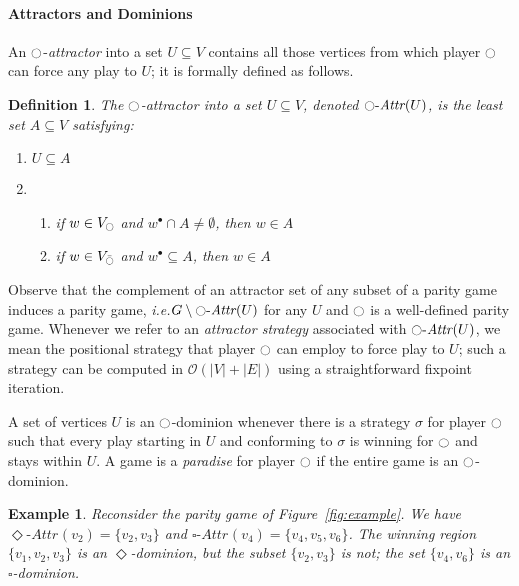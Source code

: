 \documentclass{eptcs}
\newtheorem{defi}{Definition}
\newtheorem{exam}{Example}
\newenvironment{definition}{\begin{defi} \rm }{\end{defi}}
\newenvironment{example}{\begin{exam} \rm }{\end{exam}}
\renewcommand{\i}{\ensuremath{\ocircle}\xspace}
\newcommand{\odd}{\ensuremath{\square}\xspace}
\newcommand{\even}{\ensuremath{\Diamond}\xspace}
\newcommand{\post}[1]{\ensuremath{#1^{\bullet}}}
\newcommand{\pnot}[1]{\bar{#1}}
\newcommand{\attrsym}{\ensuremath{\textit{Attr}}}
\newcommand{\attr}[3][]{\ensuremath{{#2}{\text{-}}\attrsym^{#1}(#3)}}
\newcommand{\ie}{\emph{i.e.}\xspace}
\begin{document}
\paragraph*{Attractors and Dominions}
An $\i$-\emph{attractor} into a
set $U \subseteq V$ contains all those vertices from which player $\i$ can
force any play to $U$; it is formally defined as follows.
\begin{definition} The $\i$-\emph{attractor} into a set $U \subseteq V$,
denoted $\attr{\i}{U}$, is the least set $A \subseteq V$ satisfying:
\begin{enumerate}
 \item $U \subseteq A$
 \item
 \begin{enumerate}
 \item if $w \in V_{\i}$ and $\post{w} \cap A \neq \emptyset$, then $w \in A$
 \item if $w \in V_{\pnot{\i}}$ and $\post{w} \subseteq A$, then $w \in A$
 \end{enumerate}
\end{enumerate}

\end{definition}
Observe that the complement of an attractor set of any subset of a
parity game induces a parity game, \ie $G  \setminus \attr{\i}{U}$
for any $U$ and $\i$ is a well-defined parity game.  Whenever we
refer to an \emph{attractor strategy} associated with $\attr{\i}{U}$,
we mean the positional strategy that player $\i$ can employ to force
play to $U$; such a strategy can be computed in $\mathcal{O}(|V|+|E|)$
using a straightforward fixpoint iteration.

A set of vertices $U$ is an $\i$-dominion whenever there is a
strategy $\sigma$ for player $\i$ such that every play starting in
$U$ and conforming to $\sigma$ is winning for $\i$ and stays within
$U$. A game is a \emph{paradise} for player $\i$ if the entire game
is an $\i$-dominion.

\begin{example}
Reconsider the parity game of Figure~\ref{fig:example}. We have
$\attr{\even}{v_2} = \{v_2,v_3\}$ and $\attr{\odd}{v_4} = \{v_4,v_5,v_6\}$.
The winning region $\{v_1,v_2,v_3\}$ is an $\even$-dominion, but the
subset $\{v_2,v_3\}$ is not; the set $\{v_4,v_6\}$ is an $\odd$-dominion.
\end{example}


\newcommand{\Nat}{\ensuremath{\mathbb{N}}}
\newcommand{\prog}[3]{\ensuremath{\textsf{Prog}(#1,#2,#3)}}
\newcommand{\lift}[2]{\ensuremath{\textsf{Lift}(#1,#2)}}
\newcommand{\liftodd}[2]{\ensuremath{\textsf{Lift}_\odd(#1,#2)}}
\def\progname{\textsf{Prog}}
\def\liftname{\textsf{Lift}}
\end{document}
